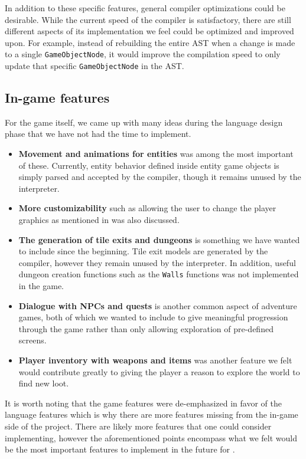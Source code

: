 In addition to these specific features, general compiler optimizations could be desirable.
While the current speed of the compiler is satisfactory, there are still different aspects of its implementation we feel could be optimized and improved upon. 
For example, instead of rebuilding the entire AST when a change is made to a single \texttt{GameObjectNode}, it would improve the compilation speed to only update that specific \texttt{GameObjectNode} in the AST.

\subsection*{In-game features}
For the game itself, we came up with many ideas during the language design phase that we have not had the time to implement. 
\begin{itemize}
  \item
    \textbf{Movement and animations for entities} was among the most important of these. 
    Currently, entity behavior defined inside entity game objects is simply parsed and accepted by the compiler, though it remains unused by the interpreter. 
  \item
      \textbf{More customizability} such as allowing the user to change the player graphics as mentioned in  was also discussed.
  \item 
    \textbf{The generation of tile exits and dungeons} is something we have wanted to include since the beginning. Tile exit models are generated by the compiler, however they remain unused by the interpreter. In addition, useful dungeon creation functions such as the \texttt{Walls} functions was not implemented in the game.
  \item
    \textbf{Dialogue with NPCs and quests} is another common aspect of adventure games, both of which we wanted to include to give meaningful progression through the game rather than only allowing exploration of pre-defined screens. 
  \item 
    \textbf{Player inventory with weapons and items} was another feature we felt would contribute greatly to giving the player a reason to explore the world to find new loot.
\end{itemize}

It is worth noting that the game features were de-emphasized in favor of the language features which is why there are more features missing from the in-game side of the project. There are likely more features that one could consider implementing, however the aforementioned points encompass what we felt would be the most important features to implement in the future for \dazel{}.